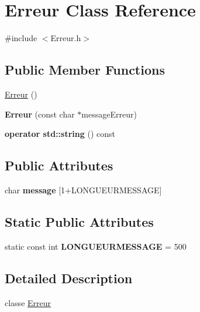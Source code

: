 \hypertarget{class_erreur}{}\section{Erreur Class Reference}
\label{class_erreur}


{\ttfamily \#include $<$Erreur.\+h$>$}

\subsection*{Public Member Functions}
\begin{DoxyCompactItemize}
\item 
\mbox{\hyperlink{class_erreur_ad79ce22141a8664be066e6e7a5686821}{Erreur}} ()
\item 
\mbox{\label{class_erreur_a15bbbbc7e23e4ea5e6bdebe8e299e6be}} 
{\bfseries Erreur} (const char $\ast$message\+Erreur)
\item 
\mbox{\label{class_erreur_a3a6fad6fcd3013b877c8ee838445ebec}} 
{\bfseries operator std\+::string} () const
\end{DoxyCompactItemize}
\subsection*{Public Attributes}
\begin{DoxyCompactItemize}
\item 
\mbox{\label{class_erreur_a55ae1259e86044a99bb4e78109ece875}} 
char {\bfseries message} \mbox{[}1+L\+O\+N\+G\+U\+E\+U\+R\+M\+E\+S\+S\+A\+GE\mbox{]}
\end{DoxyCompactItemize}
\subsection*{Static Public Attributes}
\begin{DoxyCompactItemize}
\item 
\mbox{\label{class_erreur_a4bad7e055ecc19aa6c7616ddf51d05dd}} 
static const int {\bfseries L\+O\+N\+G\+U\+E\+U\+R\+M\+E\+S\+S\+A\+GE} = 500
\end{DoxyCompactItemize}


\subsection{Detailed Description}
classe \mbox{\hyperlink{class_erreur}{Erreur}} 

